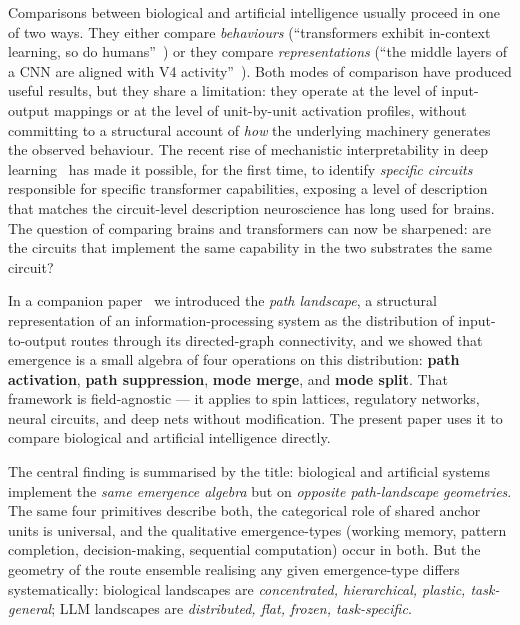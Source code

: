 \documentclass[11pt,a4paper]{article}
\begin{document}
Comparisons between biological and artificial intelligence usually
proceed in one of two ways. They either compare \emph{behaviours}
(``transformers exhibit in-context learning, so do
humans''~\cite{olsson2022induction}) or they compare
\emph{representations} (``the middle layers of a CNN are aligned with
V4 activity''~\cite{yamins2014performance}). Both modes of comparison
have produced useful results, but they share a limitation: they
operate at the level of input-output mappings or at the level of
unit-by-unit activation profiles, without committing to a structural
account of \emph{how} the underlying machinery generates the observed
behaviour. The recent rise of mechanistic interpretability in deep
learning~\cite{elhage2021mathematical,olsson2022induction,wang2022interpretability,nanda2023grokking}
has made it possible, for the first time, to identify \emph{specific
circuits} responsible for specific transformer capabilities, exposing
a level of description that matches the circuit-level description
neuroscience has long used for brains. The question of comparing
brains and transformers can now be sharpened: are the circuits that
implement the same capability in the two substrates the same circuit?

In a companion paper~\cite{companion} we introduced the
\emph{path landscape}, a structural representation of an
information-processing system as the distribution of input-to-output
routes through its directed-graph connectivity, and we showed that
emergence is a small algebra of four operations on this distribution:
\textbf{path activation}, \textbf{path suppression}, \textbf{mode
merge}, and \textbf{mode split}. That framework is field-agnostic ---
it applies to spin lattices, regulatory networks, neural circuits, and
deep nets without modification. The present paper uses it to compare
biological and artificial intelligence directly.

The central finding is summarised by the title: biological and
artificial systems implement the \emph{same emergence algebra} but on
\emph{opposite path-landscape geometries}. The same four primitives
describe both, the categorical role of shared anchor units is
universal, and the qualitative emergence-types (working memory,
pattern completion, decision-making, sequential computation) occur in
both. But the geometry of the route ensemble realising any given
emergence-type differs systematically: biological landscapes are
\emph{concentrated, hierarchical, plastic, task-general}; LLM
landscapes are \emph{distributed, flat, frozen, task-specific}.
\end{document}
